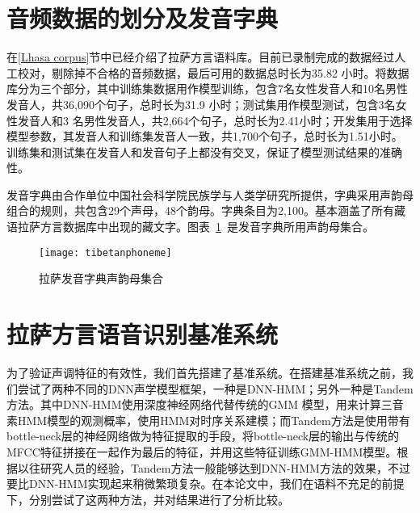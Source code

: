 \section{音频数据的划分及发音字典}\label{dataset}
在\ref{Lhasa corpus}节中已经介绍了拉萨方言语料库。目前已录制完成的数据经过人工校对，剔除掉不合格的音频数据，最后可用的数据总时长为35.82 小时。将数据库分为三个部分，其中训练集数据用作模型训练，包含7名女性发音人和10名男性发音人，共36,090个句子，总时长为31.9 小时；测试集用作模型测试，包含3名女性发音人和3 名男性发音人，共2,664个句子，总时长为2.41小时；开发集用于选择模型参数，其发音人和训练集发音人一致，共1,700个句子，总时长为1.51小时。训练集和测试集在发音人和发音句子上都没有交叉，保证了模型测试结果的准确性。

发音字典由合作单位中国社会科学院民族学与人类学研究所提供，字典采用声韵母组合的规则，共包含29个声母，48个韵母。字典条目为2,100。基本涵盖了所有藏语拉萨方言数据库中出现的藏文字。图表~\ref{fig:tibetanphoneme}~是发音字典所用声韵母集合。
\begin{figure}[htbp]
\centering
\texttt{[image: tibetanphoneme]}
\caption{拉萨发音字典声韵母集合}\label{fig:tibetanphoneme}
\vspace{\baselineskip}
\end{figure}

\section{拉萨方言语音识别基准系统}
为了验证声调特征的有效性，我们首先搭建了基准系统。在搭建基准系统之前，我们尝试了两种不同的DNN声学模型框架，一种是DNN-HMM\cite{dahl2012context}；另外一种是Tandem方法\cite{hermansky2000tandem}。其中DNN-HMM使用深度神经网络代替传统的GMM 模型，用来计算三音素HMM模型的观测概率，使用HMM对时序关系建模；而Tandem方法是使用带有bottle-neck层的神经网络做为特征提取的手段，将bottle-neck层的输出与传统的MFCC特征拼接在一起作为最后的特征，并用这些特征训练GMM-HMM模型。根据以往研究人员的经验，Tandem方法一般能够达到DNN-HMM方法的效果，不过要比DNN-HMM实现起来稍微繁琐复杂。在本论文中，我们在语料不充足的前提下，分别尝试了这两种方法，并对结果进行了分析比较。
